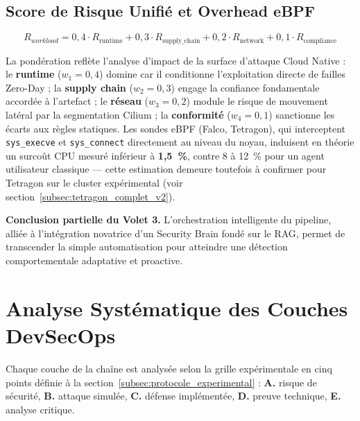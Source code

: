 \subsection{Score de Risque Unifié et Overhead eBPF}

\begin{equation}
R_{workload} = 0{,}4 \cdot R_{\text{runtime}} + 0{,}3 \cdot R_{\text{supply\_chain}} + 0{,}2 \cdot R_{\text{network}} + 0{,}1 \cdot R_{\text{compliance}}
\label{eq:r_workload_weights_justification}
\end{equation}

La pondération reflète l'analyse d'impact de la surface d'attaque Cloud Native : le \textbf{runtime} ($w_1=0{,}4$) domine car il conditionne l'exploitation directe de failles Zero-Day ; la \textbf{supply chain} ($w_2=0{,}3$) engage la confiance fondamentale accordée à l'artefact ; le \textbf{réseau} ($w_3=0{,}2$) module le risque de mouvement latéral par la segmentation Cilium ; la \textbf{conformité} ($w_4=0{,}1$) sanctionne les écarts aux règles statiques. Les sondes eBPF (Falco, Tetragon), qui interceptent \texttt{sys\_execve} et \texttt{sys\_connect} directement au niveau du noyau, induisent en théorie un surcoût CPU mesuré inférieur à \textbf{1,5~\%}, contre 8 à 12~\% pour un agent utilisateur classique — cette estimation demeure toutefois à confirmer pour Tetragon sur le cluster expérimental (voir section~\ref{subsec:tetragon_complet_v2}).

\bigskip
\noindent\textbf{Conclusion partielle du Volet 3.} L'orchestration intelligente du pipeline, alliée à l'intégration novatrice d'un Security Brain fondé sur le RAG, permet de transcender la simple automatisation pour atteindre une détection comportementale adaptative et proactive.


\section{Analyse Systématique des Couches DevSecOps}
\label{sec:analyse_systematique_couches}

Chaque couche de la chaîne est analysée selon la grille expérimentale en cinq points définie à la section~\ref{subsec:protocole_experimental} : \textbf{A.} risque de sécurité, \textbf{B.} attaque simulée, \textbf{C.} défense implémentée, \textbf{D.} preuve technique, \textbf{E.} analyse critique.

